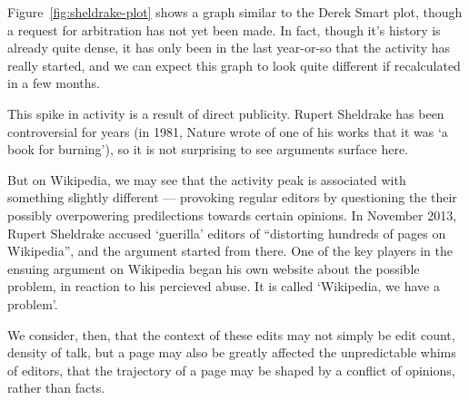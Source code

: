 Figure~\ref{fig:sheldrake-plot} shows a graph similar to the Derek
Smart plot, though a request for arbitration has not yet been made. In
fact, though it's history is already quite dense, it has only been in
the last year-or-so that the activity has really started, and we can
expect this graph to look quite different if recalculated in a few
months.

This spike in activity is a result of direct publicity. Rupert
Sheldrake has been controversial for years (in 1981, Nature wrote of
one of his works that it was `a book for burning'), so it is not
surprising to see arguments surface here. 

But on Wikipedia, we may see that the activity peak is associated with
something slightly different --- provoking regular editors by
questioning the their possibly overpowering predilections towards
certain opinions. In November 2013, Rupert Sheldrake accused
`guerilla' editors of ``distorting hundreds of pages on
Wikipedia''\cite{sheldrake-bbc-interview}, and the argument started
from there. One of the key players in the ensuing argument on
Wikipedia began his own website about the possible problem, in
reaction to his percieved abuse. It is called `Wikipedia, we have a
problem'.\cite{wiki-problem}

We consider, then, that the context of these edits may not simply be
edit count, density of talk, but a page may also be greatly affected
the unpredictable whims of editors, that the trajectory of a page may
be shaped by a conflict of opinions, rather than facts.
